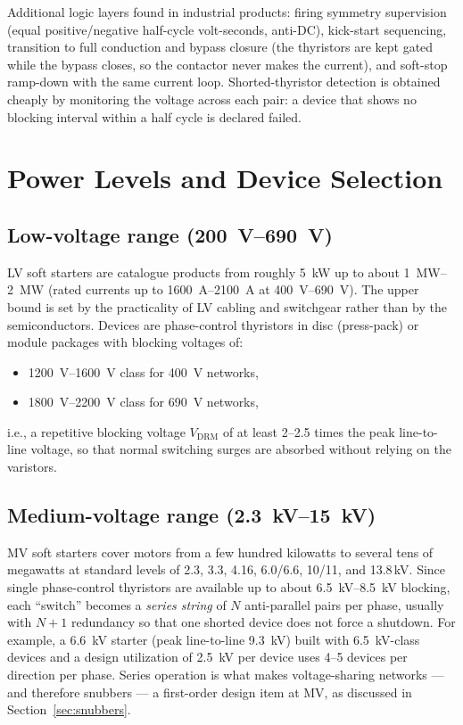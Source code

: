 \documentclass[11pt,a4paper]{article}
\begin{document}
Additional logic layers found in industrial products: firing symmetry
supervision (equal positive/negative half-cycle volt-seconds, anti-DC),
kick-start sequencing, transition to full conduction and bypass closure
(the thyristors are kept gated while the bypass closes, so the contactor
never makes the current), and soft-stop ramp-down with the same current
loop. Shorted-thyristor detection is obtained cheaply by monitoring the
voltage across each pair: a device that shows no blocking interval within a
half cycle is declared failed.

\section{Power Levels and Device Selection}

\subsection{Low-voltage range (\SIrange{200}{690}{\volt})}

LV soft starters are catalogue products from roughly \SI{5}{\kilo\watt} up to
about \SIrange{1}{2}{\mega\watt} (rated currents up to
\SIrange{1600}{2100}{\ampere} at \SI{400}{\volt}--\SI{690}{\volt}). The upper
bound is set by the practicality of LV cabling and switchgear rather than by
the semiconductors. Devices are phase-control thyristors in disc (press-pack)
or module packages with blocking voltages of:
\begin{itemize}
  \item \SIrange{1200}{1600}{\volt} class for \SI{400}{\volt} networks,
  \item \SIrange{1800}{2200}{\volt} class for \SI{690}{\volt} networks,
\end{itemize}
i.e., a repetitive blocking voltage $V_\mathrm{DRM}$ of at least 2--2.5 times
the peak line-to-line voltage, so that normal switching surges are absorbed
without relying on the varistors.

\subsection{Medium-voltage range (\SIrange{2.3}{15}{\kilo\volt})}

MV soft starters cover motors from a few hundred kilowatts to several tens of
megawatts at standard levels of 2.3, 3.3, 4.16, 6.0/6.6, 10/11, and
13.8\,\si{\kilo\volt}. Since single phase-control thyristors are available up
to about \SIrange{6.5}{8.5}{\kilo\volt} blocking, each ``switch'' becomes a
\emph{series string} of $N$ anti-parallel pairs per phase, usually with $N+1$
redundancy so that one shorted device does not force a shutdown. For example,
a \SI{6.6}{\kilo\volt} starter (peak line-to-line \SI{9.3}{\kilo\volt}) built
with \SI{6.5}{\kilo\volt}-class devices and a design utilization of
\SI{2.5}{\kilo\volt} per device uses 4--5 devices per direction per phase.
Series operation is what makes voltage-sharing networks --- and therefore
snubbers --- a first-order design item at MV, as discussed in
Section~\ref{sec:snubbers}.
\end{document}
